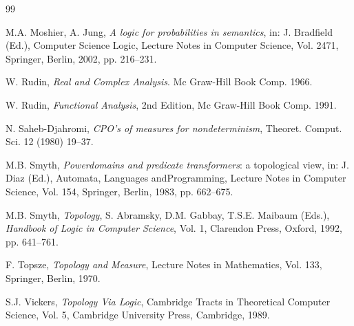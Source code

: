 \begin{thebibliography}{99}
\begin{LTR}
M.A. Moshier, A. Jung, {\em A logic for probabilities in semantics}, in: J. Bradfield (Ed.), Computer Science Logic,
Lecture Notes in Computer Science, Vol. 2471, Springer, Berlin, 2002, pp. 216–231.


W. Rudin,  {\em Real and Complex Analysis}.  Mc Graw-Hill Book Comp. 1966.

W. Rudin,  {\em Functional Analysis},  2nd Edition, Mc Graw-Hill Book Comp.  1991.

N. Saheb-Djahromi, {\em CPO’s of measures for nondeterminism}, Theoret. Comput. Sci. 12 (1980) 19–37.

%

M.B. Smyth, {\em Powerdomains and predicate transformers}: a topological view, in: J. Diaz (Ed.), Automata,
Languages andProgramming, Lecture Notes in Computer Science, Vol. 154, Springer, Berlin, 1983,
pp. 662–675.

M.B. Smyth, \textit{Topology}, S. Abramsky, D.M. Gabbay, T.S.E. Maibaum (Eds.), {\em Handbook of Logic in
Computer Science}, Vol. 1, Clarendon Press, Oxford, 1992, pp. 641–761.


F. Topsze, {\em Topology and Measure}, Lecture Notes in Mathematics, Vol. 133, Springer, Berlin, 1970.

S.J. Vickers, {\em Topology Via Logic}, Cambridge Tracts in Theoretical Computer Science, Vol. 5, Cambridge
University Press, Cambridge, 1989.

\end{LTR}
\end{thebibliography}